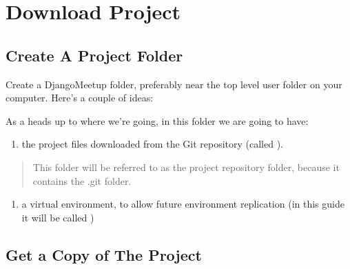 \documentclass[letterpaper,10pt,english]{sphinxmanual}
\begin{document}
\section{Download Project}
\label{\detokenize{guide/02_download-project:download-project}}\label{\detokenize{guide/02_download-project::doc}}

\subsection{Create A Project Folder}
\label{\detokenize{guide/02_download-project:create-a-project-folder}}
Create a DjangoMeetup folder, preferably near the top level user folder on your computer.  Here’s a couple of ideas:

\begin{sphinxVerbatim}[commandchars=\\\{\}]
 

 
\PYGZbs{}\PYGZbs{}\PYGZbs{}\PYGZbs{}
\end{sphinxVerbatim}

As a heads up to where we’re going, in this folder we are going to have:
\begin{enumerate}
\def\theenumi{\roman{enumi}}
\def\labelenumi{(\theenumi )}
\makeatletter\def\p@enumii{\p@enumi (\theenumi )}\makeatother
\item {} 
the project files downloaded from the Git repository (called ).

\end{enumerate}
\begin{quote}

This folder will be referred to as the project repository folder, because it contains the .git folder.
\end{quote}
\begin{enumerate}
\def\theenumi{\roman{enumi}}
\def\labelenumi{(\theenumi )}
\makeatletter\def\p@enumii{\p@enumi (\theenumi )}\makeatother
\setcounter{enumi}{1}
\item {} 
a virtual environment, to allow future environment replication (in this guide it will be called )

\end{enumerate}


\subsection{Get a Copy of The Project}
\label{\detokenize{guide/02_download-project:get-a-copy-of-the-project}}
\end{document}
